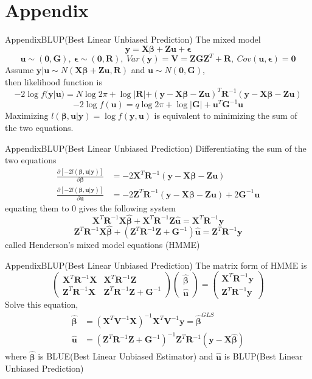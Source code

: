 \documentclass{beamer}
\def \by {\mathbf{y}}
\def \bX {\mathbf{X}}
\def \bbeta {\boldsymbol{\beta}}
\def \bepsilon {\boldsymbol{\epsilon}}
\def \bR {\boldsymbol{R}}
\def \bZ {\boldsymbol{Z}}
\def \bG {\boldsymbol{G}}
\def \bu {\boldsymbol{u}}
\def \bV {\boldsymbol{V}}
\begin{document}
\section{Appendix}
\begin{frame}{Appendix}{BLUP(Best Linear Unbiased Prediction)}
	The mixed model
	$$\by = \bX \bbeta+\bZ\bu+\bepsilon$$
	$$\bu \sim (\mathbf{0},\bG), \ \bepsilon \sim (\mathbf{0},\bR), \ Var(\by)=\bV=\bZ\bG\bZ^T+\bR, \ Cov(\bu,\bepsilon)=\mathbf{0} $$
	Assume $\by|\bu \sim N(\bX \bbeta+\bZ\bu,\bR)$ and $\bu \sim N(\mathbf{0},\bG)$,\\
	then likelihood function is
	$$ -2\log f(\by|\bu)=N\log 2\pi+\log|\bR|+(\by-\bX  \bbeta-\bZ\bu)^T\bR^{-1}(\by-\bX \bbeta-\bZ\bu) $$
	$$ -2\log f(\bu)= q\log 2\pi + \log|\bG| + \bu^T\bG^{-1}\bu $$
	Maximizing $l(\bbeta,\bu|\by)=\log f(\by,\bu)$ is equivalent to minimizing the sum of the two equations.
\end{frame}

\begin{frame}{Appendix}{BLUP(Best Linear Unbiased Prediction)}
	Differentiating the sum of the two equations
	$$ \begin{aligned}
	\frac{\partial [-2l(\bbeta,\bu|\by)]}{\partial \bbeta} &= -2\bX^T\bR^{-1}(\by-\bX\bbeta-\bZ\bu)\\
	\frac{\partial [-2l(\bbeta,\bu|\by)]}{\partial \bu} &= -2\bZ^T\bR^{-1}(\by-\bX\bbeta-\bZ\bu)+2\bG^{-1}\bu
	\end{aligned} $$ 
	equating them to $0$ gives the following system 
	$$ \bX^T\bR^{-1}\bX\hat{\bbeta}+\bX^T\bR^{-1}\bZ\hat{\bu}=\bX^T\bR^{-1}\by $$
	$$ \bZ^T\bR^{-1}\bX\hat{\bbeta}+(\bZ^T\bR^{-1}\bZ+\bG^{-1})\hat{\bu}=\bZ^T\bR^{-1}\by $$
	called Henderson's mixed model equations (HMME)
\end{frame}

\begin{frame}{Appendix}{BLUP(Best Linear Unbiased Prediction)}
	The matrix form of HMME is
	$$ \begin{pmatrix}
		\bX^T\bR^{-1}\bX & \bX^T\bR^{-1}\bZ \\
		\bZ^T\bR^{-1}\bX& \bZ^T\bR^{-1}\bZ+\bG^{-1}
	\end{pmatrix}
	\begin{pmatrix}
	\hat{\bbeta} \\
	\hat{\bu}
	\end{pmatrix} =
	\begin{pmatrix}
	\bX^T\bR^{-1}\by \\
	\bZ^T\bR^{-1}\by
	\end{pmatrix} $$
	Solve this equation,
	$$
	\begin{aligned}
	\hat{\bbeta} &= (\bX^T\bV^{-1}\bX)^{-1}\bX^T\bV^{-1}\by = \hat{\bbeta}^{GLS}\\
	\hat{\bu} &= (\bZ^T\bR^{-1}\bZ+\bG^{-1})^{-1}\bZ^T\bR^{-1}(\by-\bX\hat{\bbeta})
	\end{aligned}$$
	where $\hat{\bbeta}$ is BLUE(Best Linear Unbiased Estimator) and $\hat{\bu}$ is BLUP(Best Linear Unbiased Prediction)
\end{frame}
\end{document}
